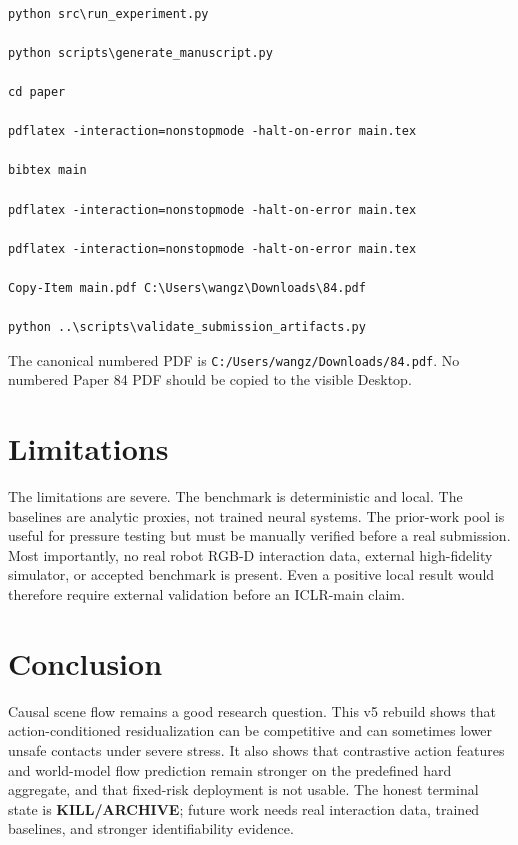 \documentclass{article}
\begin{document}
\begin{verbatim}

python src\run_experiment.py

python scripts\generate_manuscript.py

cd paper

pdflatex -interaction=nonstopmode -halt-on-error main.tex

bibtex main

pdflatex -interaction=nonstopmode -halt-on-error main.tex

pdflatex -interaction=nonstopmode -halt-on-error main.tex

Copy-Item main.pdf C:\Users\wangz\Downloads\84.pdf

python ..\scripts\validate_submission_artifacts.py

\end{verbatim}

The canonical numbered PDF is \texttt{C:/Users/wangz/Downloads/84.pdf}. No numbered Paper 84 PDF should be copied to the visible Desktop.

\section{Limitations}

The limitations are severe. The benchmark is deterministic and local. The baselines are analytic proxies, not trained neural systems. The prior-work pool is useful for pressure testing but must be manually verified before a real submission. Most importantly, no real robot RGB-D interaction data, external high-fidelity simulator, or accepted benchmark is present. Even a positive local result would therefore require external validation before an ICLR-main claim.

\section{Conclusion}

Causal scene flow remains a good research question. This v5 rebuild shows that action-conditioned residualization can be competitive and can sometimes lower unsafe contacts under severe stress. It also shows that contrastive action features and world-model flow prediction remain stronger on the predefined hard aggregate, and that fixed-risk deployment is not usable. The honest terminal state is \textbf{KILL/ARCHIVE}; future work needs real interaction data, trained baselines, and stronger identifiability evidence.
\end{document}

